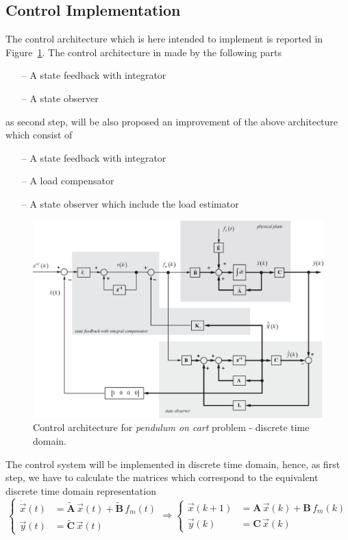 \documentclass[11pt,a4paper,oneside]{book}
\numberwithin{equation}{section}
\theoremstyle{it}
\theoremstyle{definition}
\begin{document}
\subsection{Control Implementation }
The control architecture which is here intended to implement is reported in Figure~\ref{figure_pendulum_on_cart_2}. The control architecture in made by the following parts
\begin{itemize}
	\item[--] A state feedback with integrator
	\item[--] A state observer
\end{itemize}
as second  step, will be also proposed an improvement of the above architecture which consist of
\begin{itemize}
	\item[--] A state feedback with integrator
	\item[--] A load compensator
	\item[--] A state observer which include the load estimator
\end{itemize}
\begin{figure}[H]
	\centering
	\includegraphics[width = 475pt, 
	keepaspectratio,angle=0]{figures/pendulum_on_cart/servo_pendulum_on_cart.eps}
	\captionsetup{width=0.5\textwidth, font=small}		
	\caption{Control architecture for \textit{pendulum on cart} problem - discrete time domain.}
	\label{figure_pendulum_on_cart_2}
\end{figure}
The control system will be implemented in discrete time domain, hence, as first step, we have to calculate the matrices which correspond to the equivalent discrete time domain representation 
\begin{equation}
	\left\lbrace 	\begin{aligned}
		\dot{\vec{x}}(t)  &= \tilde{\mathbf{A}} \,\vec{x}(t) 
		+\tilde{\mathbf{B}} \,f_m(t) \\[6pt]
		\vec{y}(t)  &= \tilde{\mathbf{C}} \,\vec{x}(t)
	\end{aligned}\right. \Rightarrow
	\left\lbrace 	\begin{aligned}
		\vec{x}(k+1)  &= \mathbf{A} \,\vec{x}(k) +\mathbf{B} \,f_m(k) \\[6pt]
		\vec{y}(k)  &= \mathbf{C} \,\vec{x}(k)
	\end{aligned}\right. 
\end{equation}
\end{document}
